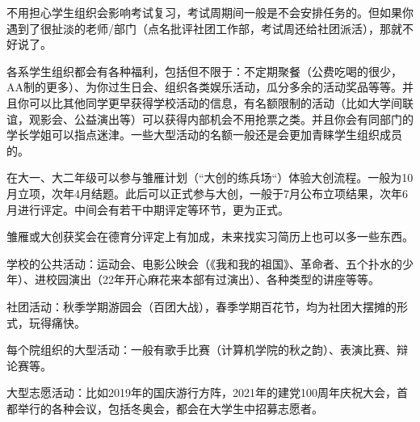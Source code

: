 不用担心学生组织会影响考试复习，考试周期间一般是不会安排任务的。但如果你遇到了很扯淡的老师/部门（点名批评社团工作部，考试周还给社团派活），那就不好说了。

各系学生组织都会有各种福利，包括但不限于：不定期聚餐（公费吃喝的很少，AA制的更多）、为你过生日会、组织各类娱乐活动，瓜分多余的活动奖品等等。并且你可以比其他同学更早获得学校活动的信息，有名额限制的活动（比如大学间联谊，观影会、公益演出等）可以获得内部机会不用抢票之类。并且你会有同部门的学长学姐可以指点迷津。一些大型活动的名额一般还是会更加青睐学生组织成员的。


在大一、大二年级可以参与雏雁计划（“大创的练兵场“）体验大创流程。一般为10月立项，次年4月结题。此后可以正式参与大创，一般于7月公布立项结果，次年6月进行评定。中间会有若干中期评定等环节，更为正式。

雏雁或大创获奖会在德育分评定上有加成，未来找实习简历上也可以多一些东西。


学校的公共活动：运动会、电影公映会（《我和我的祖国》、革命者、五个扑水的少年）、进校园演出（22年开心麻花来本部有过演出）、各种类型的讲座等等。

社团活动：秋季学期游园会（百团大战），春季学期百花节，均为社团大摆摊的形式，玩得痛快。

每个院组织的大型活动：一般有歌手比赛（计算机学院的秋之韵）、表演比赛、辩论赛等。

大型志愿活动：比如2019年的国庆游行方阵，2021年的建党100周年庆祝大会，首都举行的各种会议，包括冬奥会，都会在大学生中招募志愿者。
